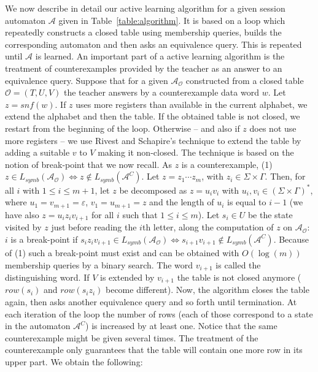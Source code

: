 \documentclass{LMCS}
\def\A{\mathcal A}
\newcommand{\symbL}{L_\mathit{symb}}
\newcommand{\can}[1]{#1^{C}}
\newcommand{\snf}{\mathit{snf}}
\begin{document}
We now describe in detail our active learning algorithm for a given
session automaton $\A$ given in Table~\ref{table:algorithm}. It is
based on a loop which repeatedly constructs a closed table using
membership queries, builds the corresponding automaton and then asks
an equivalence query. This is repeated until $\A$ is learned.  An
important part of a active learning algorithm is the treatment of
counterexamples provided by the teacher as an answer to an equivalence
query.  Suppose that for a given $\A_{\mathcal O}$ constructed from a
closed table $\mathcal O=(T,U,V)$ the teacher answers by a
counterexample data word $w$.  Let $z=\snf(w)$.  If $z$ uses more
registers than available in the current alphabet, we extend the
alphabet and then the table. If the obtained table is not closed, we
restart from the beginning of the loop.  Otherwise -- and also if $z$
does not use more registers -- we use Rivest and Schapire's
\cite{RiSh:inference} technique to extend the table by adding a
suitable $v$ to $V$ making it non-closed.  The technique is based on
the notion of break-point that we now recall.  As $z$ is a
counterexample, (1) $z \in \symbL(\A_{\mathcal O}) \iff z \not\in
\symbL(\can{\A})$.  Let $z = z_1\cdots z_{m}$, with $z_i\in
\Sigma\times \Gamma$.  Then, for all $i$ with $1 \leq i \leq m+1$, let
$z$ be decomposed as $z = u_iv_i$ with $u_i, v_i\in(\Sigma\times
\Gamma)^*$, where $u_1 = v_{m+1} = \varepsilon$, $v_1 = u_{m+1} = z$
and the length of $u_i$ is equal to $i-1$ (we have also $z =
u_iz_iv_{i+1}$ for all $i$ such that $1 \leq i \leq m$).  Let $s_i\in
U$ be the state visited by $z$ just before reading the $i$th letter,
along the computation of $z$ on $\A_{\mathcal O}$: $i$ is a
break-point if $s_iz_iv_{i+1} \in \symbL(\A_{\mathcal O}) \iff
s_{i+1}v_{i+1} \notin \symbL(\can\A)$. Because of (1) such a
break-point must exist and can be obtained with $O(\log(m))$
membership queries by a binary search.  The word $v_{i+1}$ is called
the distinguishing word.  If $V$ is extended by $v_{i+1}$ the table is
not closed anymore ($row(s_i)$ and $row(s_iz_i)$ become
different). Now, the algorithm closes the table again, then asks
another equivalence query and so forth until termination. At each
iteration of the loop the number of rows (each of those correspond to
a state in the automaton $\can{\A}$) is increased by at least one.
Notice that the same counterexample might be given several times.  The
treatment of the counterexample only guarantees that the table will
contain one more row in its upper part.  We obtain the following:
\end{document}
